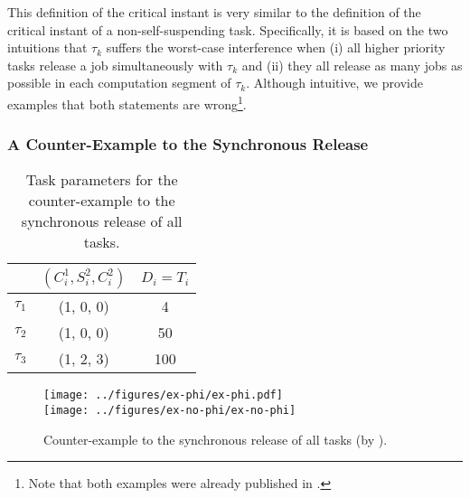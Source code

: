 This definition of the critical instant is very similar to the definition of the critical instant of a non-self-suspending task. Specifically, it is based on the two intuitions that $\tau_k$ suffers the worst-case interference when (i) all higher priority tasks release a job simultaneously with $\tau_k$ and (ii) they all release as many jobs as possible in each computation segment of $\tau_k$. Although intuitive, we provide examples that both statements are wrong\footnote{Note that both examples were already published in \cite{ecrts15nelissen}.}.

\subsubsection{A Counter-Example to the Synchronous Release}

\begin{table} 
\centering
    \begin{tabular}{|c|c|c|}
 \hline
        & $(C_i^1, S_i^2, C_i^2)$ &  $D_i=T_i$\\ 
        \hline
        $\tau_1$ & (1, 0, 0) &  4\\ 
        $\tau_2$ &  (1, 0, 0) & 50  \\ 
        $\tau_3$ & (1, 2, 3) & 100  \\
        \hline
    \end{tabular} 
    \caption{Task parameters for the counter-example to the synchronous release of all tasks.}
    \label{table:ex-synch-releases}
\end{table}

\ifpaper
\begin{figure}[t]
  \centering
\captionsetup[subfigure]{width=\columnwidth}
  \texttt{[image: ../figures/ex-phi/ex-phi.pdf]} \\
  \texttt{[image: ../figures/ex-no-phi/ex-no-phi]}
  \caption{Counter-example to the synchronous release of all tasks (by \cite{LR:rtas10}).}
  \label{fig:ex-synch-releases}
\end{figure}
\fi

